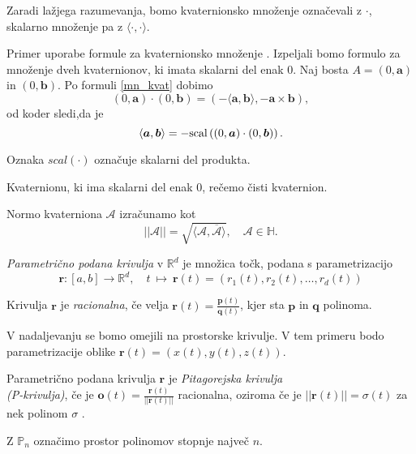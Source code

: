 \documentclass[mat1]{fmfdelo}
\newcommand{\R}{\mathbb R}
\newcommand{\HH}{\mathbb H}
\newcommand{\rr}{\boldsymbol r}
\newcommand{\pp}{\boldsymbol p}
\newcommand{\A}{\mathcal A}
\begin{document}
Zaradi lažjega razumevanja, bomo kvaternionsko množenje označevali z $\cdot$, skalarno množenje pa z $\langle\cdot,\cdot\rangle$.
\begin{primer}
	Primer uporabe formule za kvaternionsko množenje . Izpeljali bomo formulo za  množenje dveh kvaternionov, ki imata skalarni del enak 0.
	Naj bosta $A = (0,\boldsymbol{a})$ in $(0,\boldsymbol{b})$. Po formuli \ref{mn_kvat} dobimo
	\begin{equation*}
	(0,\boldsymbol{a}) \cdot (0,\boldsymbol{b}) = \left( -\langle \boldsymbol{a}, \boldsymbol{b} \rangle , -\boldsymbol{a} \times \boldsymbol{b} \right),
	\end{equation*}
	od koder sledi,da je
	\begin{equation}{\label{mn_kvat_0}}
	\langle \boldsymbol{a},\boldsymbol{b} \rangle = -{\rm scal}\left( (0,\boldsymbol{a}) \cdot (0,\boldsymbol{b}) \right).
	\end{equation}
\end{primer}
\begin{opomba}
	Oznaka $scal(\cdot)$ označuje skalarni del produkta.
\end{opomba}
\begin{opomba}
	Kvaternionu, ki ima skalarni del enak 0, rečemo čisti kvaternion.
\end{opomba}
Normo kvaterniona $\A$ izračunamo kot
\begin{equation*}
||\A|| = \sqrt{\langle \A, \overline{\A}\rangle}, \quad \A \in \HH.
\end{equation*}
\begin{definicija}
\textit{Parametrično podana krivulja} v $\R^d$ je množica točk, podana s parametrizacijo
\begin{equation*}
\rr: [ a,b ] \rightarrow \R^d, \quad t ~ \longmapsto ~\rr(t) = \left( r_1(t),r_2(t), \dots, r_d(t)\right)
\end{equation*}
\end{definicija}
\begin{definicija}
	Krivulja $\rr$ je \textit{racionalna}, če velja $\rr(t) = \frac{\pp(t)}{\boldsymbol{q}(t)}$, kjer sta $\pp$ in $\boldsymbol{q}$ polinoma.
\end{definicija}
V nadaljevanju se bomo omejili na prostorske krivulje. V tem primeru bodo parametrizacije oblike $\rr(t) = \left( x(t),y(t),z(t) \right)$.
\begin{definicija}
Parametrično podana krivulja $\rr$ je \textit{Pitagorejska krivulja\\ (P-krivulja)}, če je $\boldsymbol{o}(t) = \frac{\rr(t)}{||\rr(t)||}$ racionalna, oziroma če je $||\rr(t)|| = \sigma(t)$ za nek polinom $\sigma$ .
\end{definicija}
\begin{definicija}
	Z $\mathbb{P}_n$ označimo prostor polinomov stopnje največ $n$.
\end{definicija}
\end{document}
